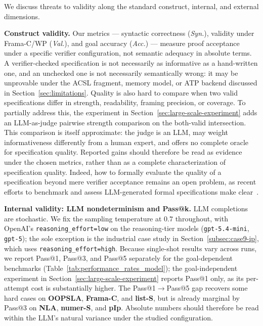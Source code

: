 \label{sec:threats}

\DIFaddbegin
We discuss threats to validity along the standard construct, internal, and
external dimensions.
\DIFaddend

\DIFaddbegin
\smallskip
\noindent\textbf{Construct validity.}
Our metrics --- syntactic correctness (\emph{Syn.}), validity under Frama-C/WP
(\emph{Val.}), and goal accuracy (\emph{Acc.}) --- measure proof acceptance
under a specific verifier configuration, not semantic adequacy in absolute
terms. A verifier-checked specification is not necessarily as informative as a
hand-written one, and an unchecked one is not necessarily semantically wrong: it
may be unprovable under the ACSL fragment, memory model, or ATP backend
discussed in Section~\ref{sec:limitations}. Quality is also hard to compare when
two valid specifications differ in strength, readability, framing precision, or
coverage. To partially address this, the experiment in
Section~\ref{sec:large-scale-experiment} adds an LLM-as-judge pairwise strength
comparison on the both-valid intersection. This comparison is itself
approximate: the judge is an LLM, may weight informativeness differently from a
human expert, and offers no complete oracle for specification quality. Reported
gains should therefore be read as evidence under the chosen metrics, rather than
as a complete characterization of specification quality. Indeed, how to
formally evaluate the quality of a specification beyond mere verifier
acceptance remains an open problem, as recent efforts to benchmark and assess
LLM-generated formal specifications make
clear~\cite{yang2026how,thakur2025clever}.
\DIFaddend

\DIFaddbegin
\smallskip
\noindent\textbf{Internal validity: LLM nondeterminism and Pass@k.}
LLM completions are stochastic. We fix the sampling temperature at $0.7$
throughout, with OpenAI's \texttt{reasoning\_effort=low} on the reasoning-tier
models (\texttt{gpt-5.4-mini}, \texttt{gpt-5}); the sole exception is the
industrial case study in Section~\ref{subsec:case9-ip}, which uses
\texttt{reasoning\_effort=high}.
\DIFaddend
\DIFaddbegin
Because single-shot results vary across runs, we report Pass@1,
Pass@3, and Pass@5 separately for the goal-dependent benchmarks
(Table~\ref{tab:performance_rates_model}); the goal-independent
experiment in Section~\ref{sec:large-scale-experiment} reports Pass@1 only, as
its per-attempt cost is substantially higher. The Pass@1$\to$Pass@5 gap recovers
some hard cases on \textbf{OOPSLA}, \textbf{Frama-C}, and \textbf{list-S}, but is
already marginal by Pass@3 on \textbf{NLA}, \textbf{numer-S}, and \textbf{pIp}.
Absolute numbers
should therefore be read within the LLM's natural variance under the studied
configuration.
\DIFaddend


